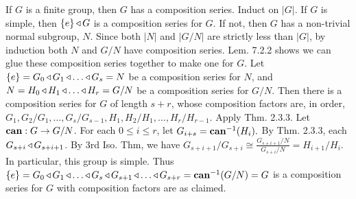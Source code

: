  If $G$ is a finite group, then $G$ has a composition series.
\wpf{} Induct on $|G|$. If $G$ is simple, then $\{e\} \operatorname{\triangleleft} G$ is a composition series for $G$. If not, then $G$ has a non-trivial normal subgroup, $N$. Since both $|N|$ and $|G/N|$ are strictly less than $|G|$, by induction both $N$ and $G/N$ have composition series. Lem. 7.2.2 shows we can glue these composition series together to make one for $G$.
 Let 
$\{e\} = G_0 \operatorname{\triangleleft} G_1 \operatorname{\triangleleft} \ldots \operatorname{\triangleleft} G_s = N$
be a composition series for $N$, and 
$N = H_0 \operatorname{\triangleleft} H_1 \operatorname{\triangleleft} \ldots \operatorname{\triangleleft} H_r = G/N$
be a composition series for $G/N$. Then there is a composition series for $G$ of length $s + r$, whose composition factors are, in order, 
$G_1, G_2/G_1, \ldots, G_s/G_{s-1},H_1,H_2/H_1,\ldots,H_r/H_{r-1}$.
\wpf{} Apply Thm. 2.3.3. Let $\text{\textbf{can}}: G \to G/N$. For each $0 \le i \le r$, let $G_{i+s} = \text{\textbf{can}}^{-1}(H_i).$ By Thm. 2.3.3, each $G_{s+i} \operatorname{\triangleleft} G_{s+i+1}$. By 3rd Iso. Thm, we have 
$G_{s+i+1}/G_{s+i} \cong \frac{G_{s+i+1}/N}{G_{s+i}/N} = H_{i+1}/H_i.$ In particular, this group is simple. Thus 
$\{e\} = G_0 \operatorname{\triangleleft} G_1 \operatorname{\triangleleft} \ldots \operatorname{\triangleleft} G_{s} \operatorname{\triangleleft} G_{s+1} \operatorname{\triangleleft} \ldots \operatorname{\triangleleft} G_{s+r} = \text{\textbf{can}}^{-1}(G/N) = G$ is a composition series for $G$ with composition factors are as claimed.
